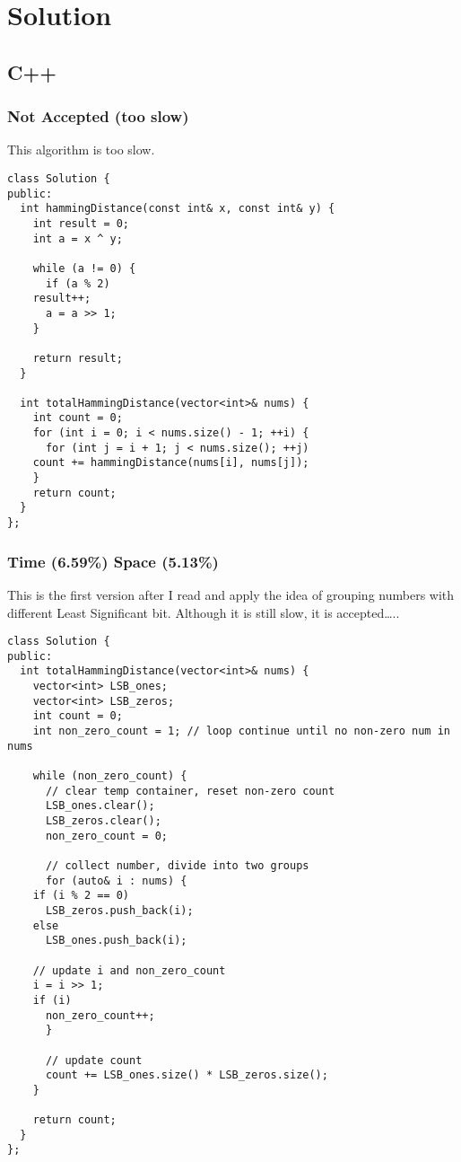 \documentclass[12pt]{book}
\begin{document}
\section{Solution}
\label{sec:org55db47b}
\subsection{C++}
\label{sec:org2c90b5e}
\subsubsection{Not Accepted (too slow)}
\label{sec:org7c5744c}
This algorithm is too slow.
\begin{verbatim}
class Solution {
public:
  int hammingDistance(const int& x, const int& y) {
    int result = 0;
    int a = x ^ y;

    while (a != 0) {
      if (a % 2)
	result++;
      a = a >> 1;
    }

    return result;
  }  

  int totalHammingDistance(vector<int>& nums) {
    int count = 0;
    for (int i = 0; i < nums.size() - 1; ++i) {
      for (int j = i + 1; j < nums.size(); ++j)
	count += hammingDistance(nums[i], nums[j]);
    }
    return count;
  }
};
\end{verbatim}
\subsubsection{Time (6.59\%) Space (5.13\%)}
\label{sec:org7abbbdb}
This is the first version after I read and apply the idea of grouping numbers with different Least Significant bit. Although it is still slow, it is accepted\ldots{}..
\begin{verbatim}
class Solution {
public:
  int totalHammingDistance(vector<int>& nums) {
    vector<int> LSB_ones;
    vector<int> LSB_zeros;
    int count = 0;
    int non_zero_count = 1; // loop continue until no non-zero num in nums

    while (non_zero_count) {
      // clear temp container, reset non-zero count
      LSB_ones.clear();
      LSB_zeros.clear();
      non_zero_count = 0;

      // collect number, divide into two groups
      for (auto& i : nums) {
	if (i % 2 == 0)
	  LSB_zeros.push_back(i);
	else 
	  LSB_ones.push_back(i);

	// update i and non_zero_count
	i = i >> 1;
	if (i)
	  non_zero_count++;
      }

      // update count 
      count += LSB_ones.size() * LSB_zeros.size();
    }

    return count;
  }
};
\end{verbatim}
\end{document}
